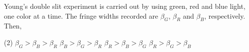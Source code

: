 
\item Young's double slit experiment is carried out by using green, red and blue light, one color at a time. The fringe widths recorded are \(\beta_G\), \(\beta_R\) and \(\beta_B\), respectively. Then,
    \begin{tasks}(2)
        \task \(\beta_G > \beta_B > \beta_R\)
        \task \(\beta_B > \beta_G > \beta_R\)
        \task \(\beta_R > \beta_B > \beta_G\)
        \task \(\beta_R > \beta_G > \beta_B\)
    \end{tasks}
